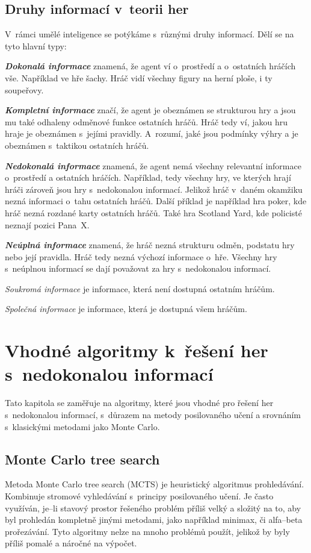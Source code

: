 \subsection{Druhy informací v~teorii her}\label{subsec:druhy-informaci-v-teorii-her}
V~rámci umělé inteligence se potýkáme s~různými druhy informací.
Dělí se na tyto hlavní typy:

\textbf{\emph{Dokonalá informace}} znamená, že agent ví o~prostředí a o~ostatních hráčích vše.
Například ve hře šachy.
Hráč vidí všechny figury na herní ploše, i ty soupeřovy.

\textbf{\emph{Kompletní informace}} značí, že agent je obeznámen se strukturou hry a jsou mu také odhaleny odměnové funkce ostatních hráčů.
Hráč tedy ví, jakou hru hraje je obeznámen s~jejími pravidly.
A~rozumí, jaké jsou podmínky výhry a je obeznámen s~taktikou ostatních hráčů.

\textbf{\emph{Nedokonalá informace}} znamená, že agent nemá všechny relevantní informace o~prostředí a ostatních hráčích.
Například, tedy všechny hry, ve kterých hrají hráči zároveň jsou hry s~nedokonalou informací.
Jelikož hráč v~daném okamžiku nezná informaci o~tahu ostatních hráčů.
Další příklad je například hra poker, kde hráč nezná rozdané karty ostatních hráčů.
Také hra Scotland Yard, kde policisté neznají pozici Pana~X\@.

\textbf{\emph{Neúplná informace}} znamená, že hráč nezná strukturu odměn, podstatu hry nebo její pravidla.
Hráč tedy nezná výchozí informace o~hře.
Všechny hry s~neúplnou informací se dají považovat za hry s~nedokonalou informací.

\emph{Soukromá informace} je informace, která není dostupná ostatním hráčům.

\emph{Společná informace} je informace, která je dostupná všem hráčům.

\section{Vhodné algoritmy k~řešení her s~nedokonalou informací}\label{sec:vhodne-algoritmy-k-reseni-her-s-nedokonalou-informaci}

Tato kapitola se zaměřuje na algoritmy, které jsou vhodné pro řešení her s~nedokonalou informací, s~důrazem na metody posilovaného učení a srovnáním s~klasickými metodami jako Monte Carlo.

\subsection{Monte Carlo tree search}\label{subsec:monte-carlo-tree-search}
Metoda Monte Carlo tree search (MCTS) je heuristický algoritmus prohledávání.
Kombinuje stromové vyhledávání s~principy posilovaného učení.
Je často využíván, je--li stavový prostor řešeného problém příliš velký a složitý na to, aby byl prohledán kompletně jinými metodami, jako například minimax, či alfa--beta prořezávání.
Tyto  algoritmy nelze na mnoho problémů použít, jelikož by byly příliš pomalé a náročné na výpočet.

